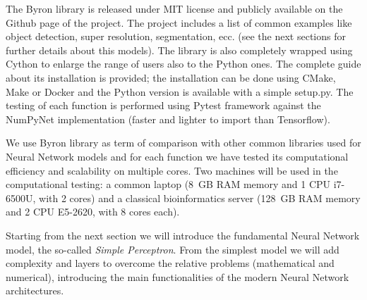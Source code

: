 \documentclass{standalone}
\begin{document}
The \textsf{Byron} library is released under \textsf{MIT} license and publicly available on the \textsf{Github} page of the project.
The project includes a list of common examples like object detection, super resolution, segmentation, ecc. (see the next sections for further details about this models).
The library is also completely wrapped using \textsf{Cython} to enlarge the range of users also to the \textsf{Python} ones.
The complete guide about its installation is provided; the installation can be done using \textsf{CMake}, \textsf{Make} or \textsf{Docker} and the \textsf{Python} version is available with a simple \textsf{setup.py}.
The testing of each function is performed using \textsf{Pytest} framework against the \textsf{NumPyNet} implementation (faster and lighter to import than \textsf{Tensorflow}).

We use \textsf{Byron} library as term of comparison with other common libraries used for Neural Network models and for each function we have tested its computational efficiency and scalability on multiple cores.
Two machines will be used in the computational testing: a common laptop (8~GB RAM memory and 1 CPU i7-6500U, with 2 cores) and a classical bioinformatics server (128~GB RAM memory and 2 CPU E5-2620, with 8 cores each).

Starting from the next section we will introduce the fundamental Neural Network model, the so-called \emph{Simple Perceptron}.
From the simplest model we will add complexity and layers to overcome the relative problems (mathematical and numerical), introducing the main functionalities of the modern Neural Network architectures.
\end{document}
